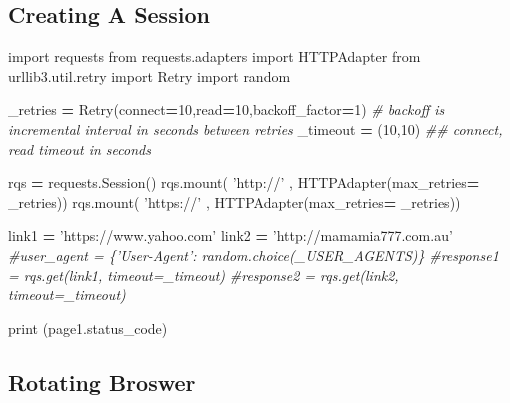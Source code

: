 \documentclass[
]{book}
\newenvironment{Shaded}{\begin{snugshade}}{\end{snugshade}}
\newcommand{\BuiltInTok}[1]{#1}
\newcommand{\CommentTok}[1]{\textcolor[rgb]{0.37,0.37,0.37}{\textit{#1}}}
\newcommand{\DecValTok}[1]{\textcolor[rgb]{0.06,0.06,0.06}{#1}}
\newcommand{\ExtensionTok}[1]{#1}
\newcommand{\ImportTok}[1]{#1}
\newcommand{\NormalTok}[1]{#1}
\newcommand{\OperatorTok}[1]{\textcolor[rgb]{0.43,0.43,0.43}{\textbf{#1}}}
\newcommand{\StringTok}[1]{\textcolor[rgb]{0.5,0.5,0.5}{#1}}
\begin{document}
\hypertarget{creating-a-session}{%
\subsection{Creating A Session}\label{creating-a-session}}

\begin{Shaded}
\begin{Highlighting}[]
\ImportTok{import}\NormalTok{ requests}
\ImportTok{from}\NormalTok{ requests.adapters }\ImportTok{import}\NormalTok{ HTTPAdapter}
\ImportTok{from}\NormalTok{ urllib3.util.retry }\ImportTok{import}\NormalTok{ Retry}
\ImportTok{import}\NormalTok{ random}


\NormalTok{_retries }\OperatorTok{=}\NormalTok{ Retry(}\ExtensionTok{connect}\OperatorTok{=}\DecValTok{10}\NormalTok{,read}\OperatorTok{=}\DecValTok{10}\NormalTok{,backoff_factor}\OperatorTok{=}\DecValTok{1}\NormalTok{)   }\CommentTok{# backoff is incremental interval in seconds between retries}
\NormalTok{_timeout }\OperatorTok{=}\NormalTok{ (}\DecValTok{10}\NormalTok{,}\DecValTok{10}\NormalTok{)  }\CommentTok{## connect, read timeout in seconds}

\NormalTok{rqs }\OperatorTok{=}\NormalTok{ requests.Session()}
\NormalTok{rqs.mount( }\StringTok{'http://'}\NormalTok{ ,  HTTPAdapter(max_retries}\OperatorTok{=}\NormalTok{ _retries))}
\NormalTok{rqs.mount( }\StringTok{'https://'}\NormalTok{ , HTTPAdapter(max_retries}\OperatorTok{=}\NormalTok{ _retries))}
\end{Highlighting}
\end{Shaded}

\begin{Shaded}
\begin{Highlighting}[]
\NormalTok{link1 }\OperatorTok{=} \StringTok{'https://www.yahoo.com'}
\NormalTok{link2 }\OperatorTok{=} \StringTok{'http://mamamia777.com.au'}
\CommentTok{#user_agent = \{'User-Agent': random.choice(_USER_AGENTS)\}}
\CommentTok{#response1  = rqs.get(link1, timeout=_timeout)}
\CommentTok{#response2  = rqs.get(link2, timeout=_timeout)  }
\end{Highlighting}
\end{Shaded}

\begin{Shaded}
\begin{Highlighting}[]
\BuiltInTok{print}\NormalTok{ (page1.status_code)}
\end{Highlighting}
\end{Shaded}

\hypertarget{rotating-broswer}{%
\subsection{Rotating Broswer}\label{rotating-broswer}}
\end{document}
